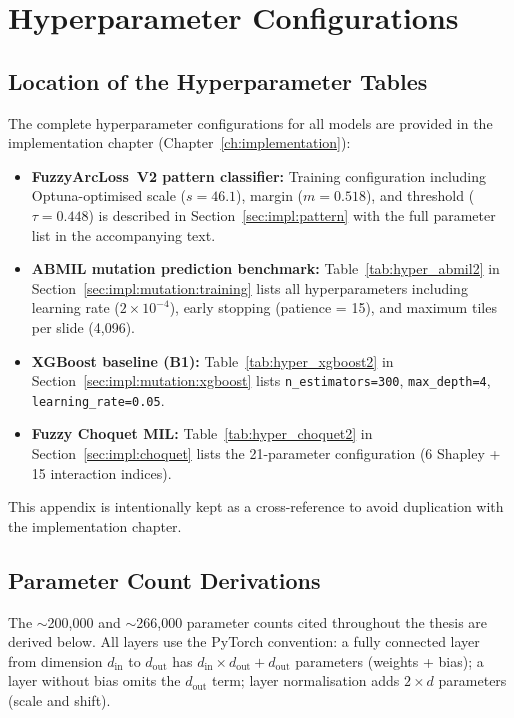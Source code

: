 \chapter{Hyperparameter Configurations}
\label{app:hyperparameters}

\section{Location of the Hyperparameter Tables}
\label{app:hyper:pointers}

The complete hyperparameter configurations for all models are provided
in the implementation chapter (Chapter~\ref{ch:implementation}):

\begin{itemize}
    \item \textbf{FuzzyArcLoss~V2 pattern classifier:}
    Training configuration including Optuna-optimised scale ($s = 46.1$),
    margin ($m = 0.518$), and threshold ($\tau = 0.448$) is described in
    Section~\ref{sec:impl:pattern} with the full parameter list in the
    accompanying text.

    \item \textbf{ABMIL mutation prediction benchmark:}
    Table~\ref{tab:hyper_abmil2} in
    Section~\ref{sec:impl:mutation:training} lists all hyperparameters
    including learning rate ($2 \times 10^{-4}$), early stopping
    (patience = 15), and maximum tiles per slide (4{,}096).

    \item \textbf{XGBoost baseline (B1):}
    Table~\ref{tab:hyper_xgboost2} in
    Section~\ref{sec:impl:mutation:xgboost} lists
    \texttt{n\_estimators=300}, \texttt{max\_depth=4},
    \texttt{learning\_rate=0.05}.

    \item \textbf{Fuzzy Choquet MIL:}
    Table~\ref{tab:hyper_choquet2} in
    Section~\ref{sec:impl:choquet} lists the 21-parameter
    configuration (6 Shapley + 15 interaction indices).
\end{itemize}

This appendix is intentionally kept as a cross-reference to avoid
duplication with the implementation chapter.


\section{Parameter Count Derivations}
\label{app:param_counts}

The $\sim$200{,}000 and $\sim$266{,}000 parameter counts cited
throughout the thesis are derived below.
All layers use the PyTorch convention:
a fully connected layer from dimension $d_{\text{in}}$ to
$d_{\text{out}}$ has $d_{\text{in}} \times d_{\text{out}} + d_{\text{out}}$
parameters (weights + bias); a layer without bias omits the
$d_{\text{out}}$ term; layer normalisation adds $2 \times d$ parameters
(scale and shift).


